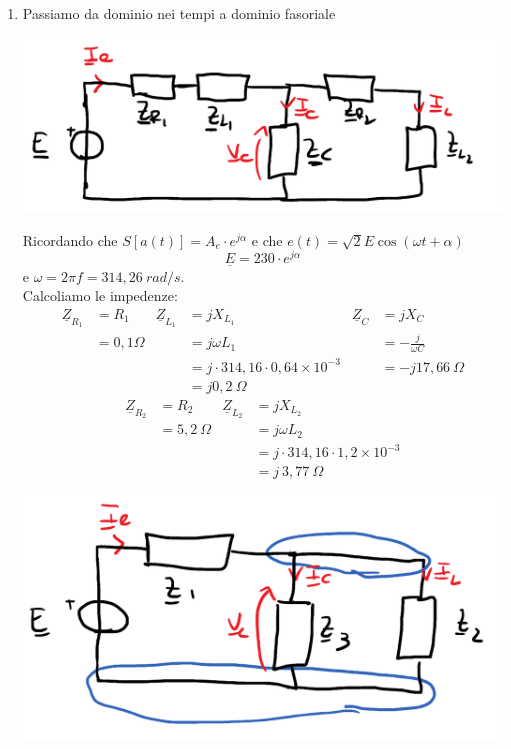 \documentclass{article}
\begin{document}
\begin{enumerate}[label=\protect\circled{\arabic*}]
    \item Passiamo da dominio nei tempi a dominio fasoriale
    \begin{center}
        \includegraphics[scale=0.26]{Image/Es_Regime_Sinusoiudale_1_1.png}
    \end{center}
    Ricordando che $S[a(t)]=A_e \cdot e^{j \alpha}$ e che $e(t) = \sqrt{2} E \cos(\omega t + \alpha)$
    \[\underline{E}=230 \cdot e^{j \alpha}\]
    e $\omega = 2 \pi f = 314,26 \ rad/s$.
    \vspace*{0.1cm}\\
    Calcoliamo le impedenze:
    \begin{align*}
        \underline{Z}_{R_1} &= R_1 & 
        \underline{Z}_{L_1} &= j X_{L_1}&
        \underline{Z}_C &= j X_C\\
        &=0,1 \Omega & &=j \omega L_1 & &=-\frac{j}{\omega C}
        \\
        & & 
        &= j \cdot 314,16 \cdot 0,64 \times 10^{-3} &
        &= - j 17,66 \ \Omega
        \\
        & & 
        &= j 0,2 \ \Omega
    \end{align*}
    \begin{align*}
        \underline{Z}_{R_2} &= R_2 &
        \underline{Z}_{L_2} &= jX_{L_2}
        \\
        &= 5,2 \ \Omega & &= j \omega L_2
        \\
        & &
        &=j \cdot 314,16 \cdot 1,2 \times 10^{-3}
        \\
        & &
        &= j \ 3,77 \ \Omega
    \end{align*}
    \begin{center}
        \includegraphics[scale=0.26]{Image/Es_Regime_Sinusoiudale_1_2.png}

\end{center}
\end{enumerate}
\end{document}
